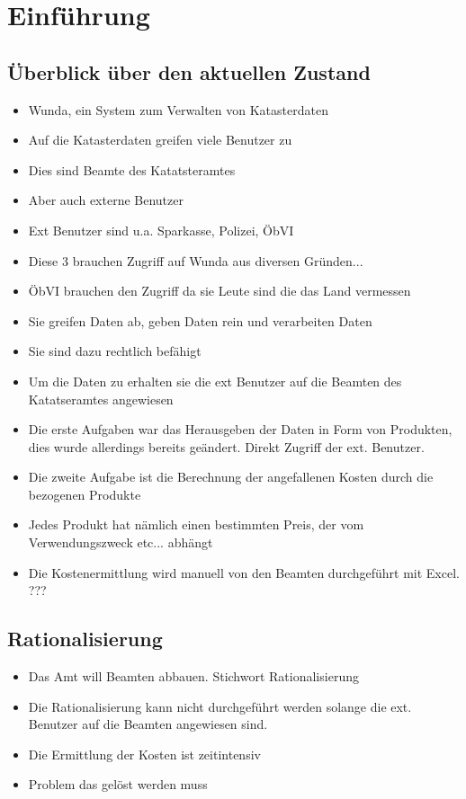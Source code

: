 \chapter{Einführung}
\section{Überblick über den aktuellen Zustand}
\begin{itemize}
	\item Wunda, ein System zum Verwalten von Katasterdaten
	\item Auf die Katasterdaten greifen viele Benutzer zu
	\item Dies sind Beamte des Katatsteramtes
	\item Aber auch externe Benutzer
	\item Ext Benutzer sind u.a. Sparkasse, Polizei, \ac{ÖbVI}
	\item Diese 3 brauchen Zugriff auf Wunda aus diversen Gründen...
	\item \ac{ÖbVI} brauchen den Zugriff da sie Leute sind die das Land vermessen
	\item Sie greifen Daten ab, geben Daten rein und verarbeiten Daten
	\item Sie sind dazu rechtlich befähigt
	\item Um die Daten zu erhalten sie die ext Benutzer auf die Beamten des Katatseramtes angewiesen
	\item Die erste Aufgaben war das Herausgeben der Daten in Form von Produkten, dies wurde allerdings bereits geändert. Direkt Zugriff der ext. Benutzer.
	\item Die zweite Aufgabe ist die Berechnung der angefallenen Kosten durch die bezogenen Produkte
	\item Jedes Produkt hat nämlich einen bestimmten Preis, der vom Verwendungszweck etc... abhängt
	\item Die Kostenermittlung wird manuell von den Beamten durchgeführt mit Excel. ???
\end{itemize}

\section{Rationalisierung}
\begin{itemize}
	\item Das Amt will Beamten abbauen. Stichwort Rationalisierung
	\item Die Rationalisierung kann nicht durchgeführt werden solange die ext. Benutzer auf die Beamten angewiesen sind.
	\item Die Ermittlung der Kosten ist zeitintensiv
	\item Problem das gelöst werden muss
\end{itemize}

